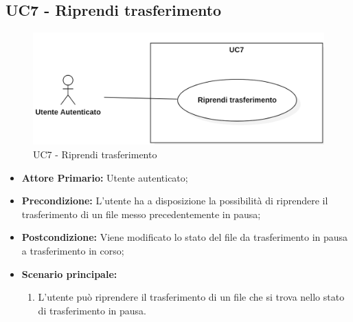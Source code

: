 \subsection{UC7 - Riprendi trasferimento}
\begin{figure}[H]
    \centering
    \includegraphics[scale = 0.4]{components/img/UC7.png}
    \caption{UC7 - Riprendi trasferimento}
\end{figure}
\begin{itemize}
\item \textbf{Attore Primario:} Utente autenticato;
\item \textbf{Precondizione:} L'utente ha a disposizione la possibilità di riprendere il trasferimento di un file messo precedentemente in pausa;
\item \textbf{Postcondizione:} Viene modificato lo stato del file da trasferimento in pausa a trasferimento in corso;
\item \textbf{Scenario principale:}
    \begin{enumerate}
    \item L'utente può riprendere il trasferimento di un file che si trova nello stato di trasferimento in pausa.
    \end{enumerate}
\end{itemize}